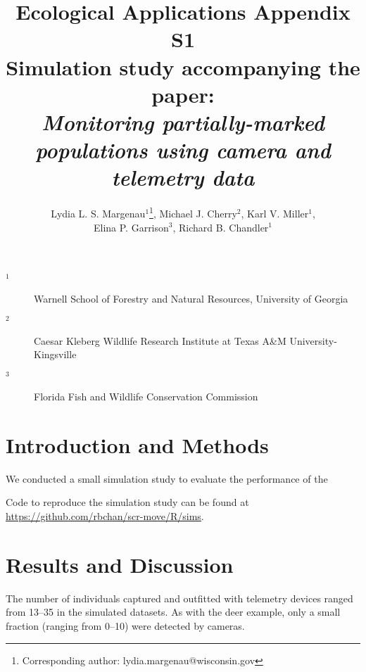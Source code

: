 \documentclass[12pt]{article}
\title{Ecological Applications Appendix S1 \\ Simulation study accompanying the paper: \\ \it Monitoring partially-marked populations using camera and telemetry data }
\author{Lydia L. S. Margenau$^{1}$\footnote{Corresponding author: lydia.margenau@wisconsin.gov}, Michael J. Cherry$^2$,  Karl V. Miller$^1$, \\ Elina P. Garrison$^3$, Richard B. Chandler$^1$}
\begin{document}
\maketitle

\vspace{12pt}

\begin{description}%
\item[$^1$] Warnell School of Forestry and Natural Resources, University of Georgia %
\item[$^2$] Caesar Kleberg Wildlife Research Institute at Texas A\&M University-Kingsville %
\item[$^3$] Florida Fish and Wildlife Conservation Commission %
\end{description}

\clearpage

\section*{Introduction and Methods}

We conducted a small simulation study to evaluate the performance of the

Code to reproduce the simulation study can be found at
\url{https://github.com/rbchan/scr-move/R/sims}.


\section*{Results and Discussion}

The number of individuals captured and outfitted with telemetry
devices ranged from 13--35 in the simulated datasets. As with the deer
example, only a small fraction (ranging from 0--10) were detected by
cameras. 




\end{document}
